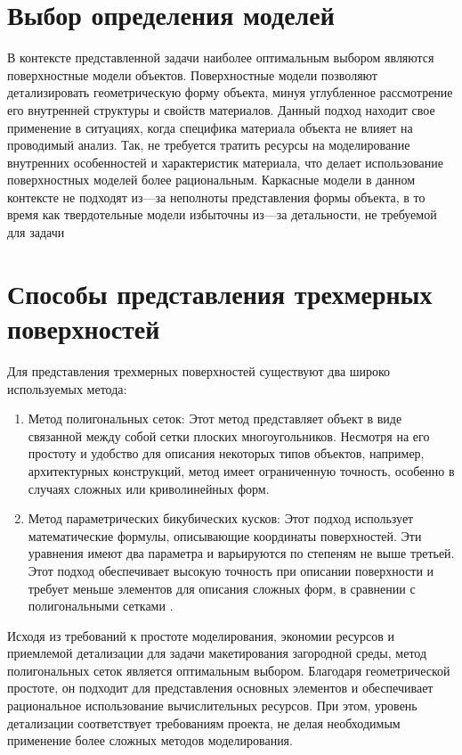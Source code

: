 \section*{Выбор определения моделей} %
В контексте представленной задачи наиболее оптимальным выбором являются поверхностные модели объектов. Поверхностные модели позволяют детализировать геометрическую форму объекта, минуя углубленное рассмотрение его внутренней структуры и свойств материалов. Данный подход находит свое применение в ситуациях, когда специфика материала объекта не влияет на проводимый анализ. Так, не требуется тратить ресурсы на моделирование внутренних особенностей и характеристик материала, что делает использование поверхностных моделей более рациональным. Каркасные модели в данном контексте не подходят из---за неполноты представления формы объекта, в то время как твердотельные модели избыточны из---за детальности, не требуемой для задачи


\section{Способы представления трехмерных поверхностей}

Для представления трехмерных поверхностей существуют два широко используемых метода:

\begin{enumerate}
\item Метод полигональных сеток: Этот метод представляет объект в виде связанной между собой сетки плоских многоугольников. Несмотря на его простоту и удобство для описания некоторых типов объектов, например, архитектурных конструкций, метод имеет ограниченную точность, особенно в случаях сложных или криволинейных форм.
\item Метод параметрических бикубических кусков: Этот подход использует математические формулы, описывающие координаты поверхностей. Эти уравнения имеют два параметра и варьируются по степеням не выше третьей. Этот подход обеспечивает высокую точность при описании поверхности и требует меньше элементов для описания сложных форм, в сравнении с полигональными сетками \cite{model_geom}.
\end{enumerate}

Исходя из требований к простоте моделирования, экономии ресурсов и приемлемой детализации для задачи макетирования загородной среды, метод полигональных сеток является оптимальным выбором. Благодаря геометрической простоте, он подходит для представления основных элементов и обеспечивает рациональное использование вычислительных ресурсов. При этом, уровень детализации соответствует требованиям проекта, не делая необходимым применение более сложных методов моделирования.

